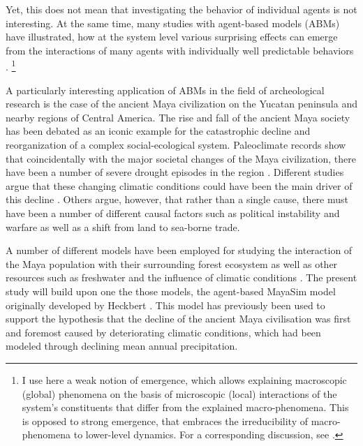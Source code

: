 Yet, this does not mean that investigating the behavior of individual agents is not interesting. At the same time, many studies with agent-based models (ABMs) have illustrated, how at the system level various surprising effects can emerge from the interactions of many agents with individually well predictable behaviors \citep{Epstein1999}. \footnote{I use here a weak notion of emergence, which allows explaining macroscopic (global) phenomena on the basis of microscopic (local) interactions of the system's constituents that differ from the explained macro-phenomena. This is opposed to strong emergence, that embraces the irreducibility of macro-phenomena to lower-level dynamics. For a corresponding discussion, see \citet{Bedau1997}.} 


A particularly interesting application of ABMs in the field of archeological research is the case of the ancient Maya civilization on the Yucatan peninsula and nearby regions of Central America. The rise and fall of the ancient Maya society has been debated as an iconic example for the catastrophic decline and reorganization of a complex social-ecological system. 
Paleoclimate records show that coincidentally with the major societal changes of the Maya civilization, there have been a number of severe drought episodes in the region \cite{Evans2018}.
Different studies argue that these changing climatic conditions could have been the main driver of this decline \citep{Medina-Elizalde2012, Kennett2012}. Others argue, however, that rather than a single cause, there must have been a number of different causal factors \citep{Masson2012} such as political instability and warfare as well as a shift from land to sea-borne trade.

A number of different models have been employed for studying the interaction of the Maya population with their surrounding forest ecosystem as well as other resources such as freshwater and the influence of climatic conditions \citep{Heckbert2013,Turner2012a, ertsen2018}. The present study will build upon one the those models, the agent-based MayaSim model originally developed by Heckbert \citep{Heckbert2013, Heckbert2013model}. This model has previously been used to support the hypothesis that the decline of the ancient Maya civilisation was first and foremost caused by deteriorating climatic conditions, which had been modeled through declining mean annual precipitation.

